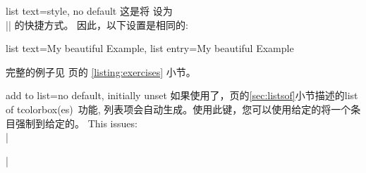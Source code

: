   
\begin{docTcbKey}[][doc new=2014-09-19]{list text}{=}{style, no default}
  这是将  设为\\
  |\protect\numberline{\thetcbcounter}| 的快捷方式。
  因此，以下设置是相同的:
  \begin{dispListing}
  list text={My beautiful Example},
  list entry={\protect\numberline{\thetcbcounter}My beautiful Example}
  \end{dispListing}
  完整的例子见 \pageref{listing:exercises} 页的 \ref{listing:exercises} 小节。
  \end{docTcbKey}



\begin{docTcbKey}{add to list}{=}{no default, initially unset}
  如果使用了，\pageref{sec:listsof}页的\ref{sec:listsof}小节描述的\flqq list of tcolorbox(es)\frqq\ 功能, 列表项会自动生成。使用此键，您可以使用给定的将一个条目强制到给定的。
  This issues:\\
  |\addcontentsline|
  \end{docTcbKey}





